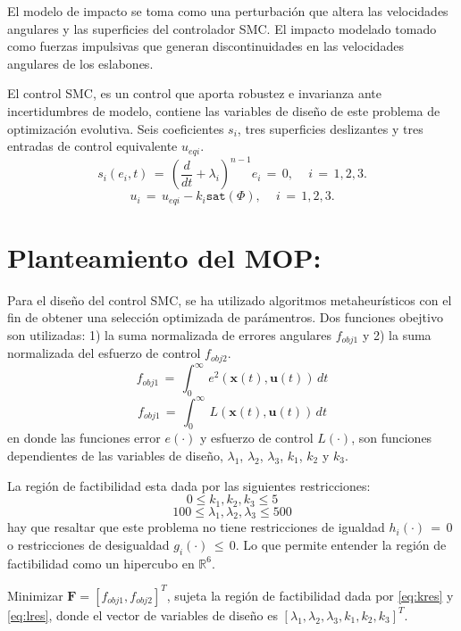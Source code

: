 \documentclass[10pt,onecolumn,twoside,letterpaper]{article}
\begin{document}
\begin{multicols}{2}
\par El modelo de impacto se toma como una perturbaci\'on que altera las velocidades angulares y las superficies del controlador SMC. El impacto modelado tomado como fuerzas impulsivas que generan discontinuidades en las velocidades angulares de los eslabones.
\par El control SMC, es un control que aporta robustez e invarianza ante incertidumbres de modelo, contiene las variables de dise\~no de este problema de optimizaci\'on evolutiva. Seis coeficientes $s_i$, tres superficies deslizantes y tres entradas de control equivalente $u_{eqi}$.
\begin{equation}
  \label{eq:superficies}
  s_i(e_i,t)\,=\,\left(\frac{d}{dt} + \lambda_i\right)^{n-1}e_i\,=\,0,\mathtt{\quad}\,i\,=\,1,2,3.
\end{equation}
\begin{equation}
  \label{eq:sencontrol}
  u_i\,=\,u_{eqi}-k_i\mathtt{sat}(\Phi),\mathtt{\quad}\,i\,=\,1,2,3.
\end{equation}
\section{Planteamiento del MOP:}
Para el dise\~no del control SMC, se ha utilizado algoritmos metaheur\'isticos con el fin de obtener una selecci\'on optimizada de par\'amentros. Dos funciones obejtivo son utilizadas: 1) la suma normalizada de errores angulares $f_{obj1}$ y 2) la suma normalizada del esfuerzo de control $f_{obj2}$.
\begin{equation}
  \label{eq:f1}
  f_{obj1}\,=\,\int_0^{\infty}\,e^2(\mathbf{x}(t),\mathbf{u}(t))\,dt
\end{equation}
\begin{equation}
  \label{eq:f2}
  f_{obj1}\,=\,\int_0^{\infty}\,L(\mathbf{x}(t),\mathbf{u}(t))\,dt
\end{equation}
en donde las funciones error $e(\cdot)$ y esfuerzo de control $L(\cdot)$, son funciones dependientes de las variables de dise\~no, $\lambda_1$, $\lambda_2$, $\lambda_3$, $k_1$, $k_2$ y $k_3$.
\par La regi\'on de factibilidad esta dada por las siguientes restricciones:
\begin{equation}
  \label{eq:kres}
  0\leq k_1,k_2,k_3\leq 5
\end{equation}
\begin{equation}
  \label{eq:lres}
  100\leq \lambda_1,\lambda_2,\lambda_3\leq 500
\end{equation}
hay que resaltar que este problema no tiene restricciones de igualdad $h_i(\cdot)\,=\,0$ o restricciones de desigualdad $g_i(\cdot)\,\leq\,0$. Lo que permite entender la regi\'on de factibilidad como un hipercubo en $\mathbb{R}^6$.
\par Minimizar $\mathbf{F}=[f_{obj1},f_{obj2}]^T$, sujeta la regi\'on de factibilidad dada por \ref{eq:kres} y \ref{eq:lres}, donde el vector de variables de dise\~no es $[\lambda_1,\lambda_2,\lambda_3,k_1,k_2,k_3]^T$.

\end{multicols}
\end{document}
